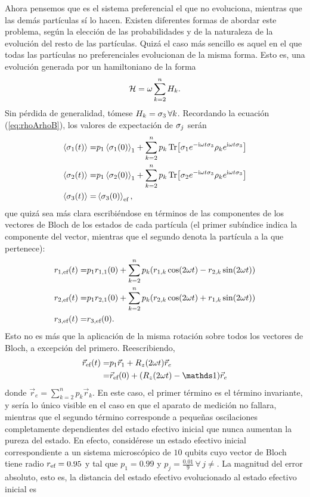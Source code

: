 Ahora pensemos que es el sistema preferencial el que no evoluciona, mientras que las demás partículas sí lo hacen. Existen diferentes formas de abordar este problema, según la elección de las probabilidades y de la naturaleza de la evolución del resto de las partículas. Quizá el caso más sencillo es aquel en el que todas las partículas no preferenciales evolucionan de la misma forma. Esto es, una evolución generada por un hamiltoniano de la forma
\begin{equation}
    \mathcal{H}=\omega \sum_{k=2}^{n}H_{k}.\nonumber
\end{equation}
Sin pérdida de generalidad, tómese $H_{k}=\sigma_{3}\,\forall k$. Recordando la ecuación (\ref{eq:rhoArhoB}), los valores de expectación de $\sigma_{j}$ serán
\begin{align}
    \expval{\sigma_{1}(t)}=&p_{1} \expval{\sigma_{1}(0)}_{1}+\sum_{k=2}^{n}p_{k}\Tr[\sigma_{1}e^{-\text{i}\omega t\sigma_{3}} \rho_{k} e^{\text{i}\omega t\sigma_{3}}]\nonumber\\
    \expval{\sigma_{2}(t)}=&p_{1} \expval{\sigma_{2}(0)}_{1}+\sum_{k=2}^{n}p_{k}\Tr[\sigma_{2}e^{-\text{i}\omega t\sigma_{3}} \rho_{k} e^{\text{i}\omega t\sigma_{3}}]\nonumber\\
    \expval{\sigma_{3}(t)}=&\expval{\sigma_{3}(0)}_{\text{ef}},\nonumber
\end{align}
que quizá sea más clara escribiéndose en términos de las componentes de los vectores de Bloch de los estados de cada partícula (el primer subíndice indica la componente del vector, mientras que el segundo denota la partícula a la que pertenece):
\begin{align}
    r_{1,\text{ef}}(t)=&p_{1}r_{1,1}(0)+\sum_{k=2}^{n}p_{k}(r_{1,k}\cos(2\omega t)-r_{2,k}\sin(2\omega t))\nonumber\\
    r_{2,\text{ef}}(t)=&p_{1}r_{2,1}(0)+\sum_{k=2}^{n}p_{k}(r_{2,k}\cos(2\omega t)+r_{1,k}\sin(2\omega t))\nonumber\\
    r_{3,\text{ef}}(t)=&r_{3,\text{ef}}(0).\nonumber
\end{align}
Esto no es más que la aplicación de la misma rotación sobre todos los vectores de Bloch, a excepción del primero. Reescribiendo,
\begin{align}
    \vec{r}_{\ef}(t)=&p_{1}\vec{r}_{1}+R_{z}(2\omega t)\vec{r}_{e}\nonumber\\
    =&\vec{r}_{\ef}(0)+(R_{z}(2\omega t)-\Id)\vec{r}_{e}\nonumber
\end{align}
donde $\vec{r}_{e}=\sum_{k=2}^{n}p_{k}\vec{r}_{k}$.
En este caso, el primer término es el término invariante, y sería lo único visible en el caso en que el aparato de medición no fallara, mientras que el segundo término corresponde a pequeñas oscilaciones completamente dependientes del estado efectivo inicial que nunca aumentan la pureza del estado. En efecto, considérese un estado efectivo inicial correspondiente a un sistema microscópico de $10$ qubits cuyo vector de Bloch tiene radio $r_{\text{ef}}=0.95$ y tal que $p_{1}=0.99$ y $p_{j}=\frac{0.01}{9}\,\forall\,j\neq $. La magnitud del error absoluto, esto es, la distancia del estado efectivo evolucionado al estado efectivo inicial es
